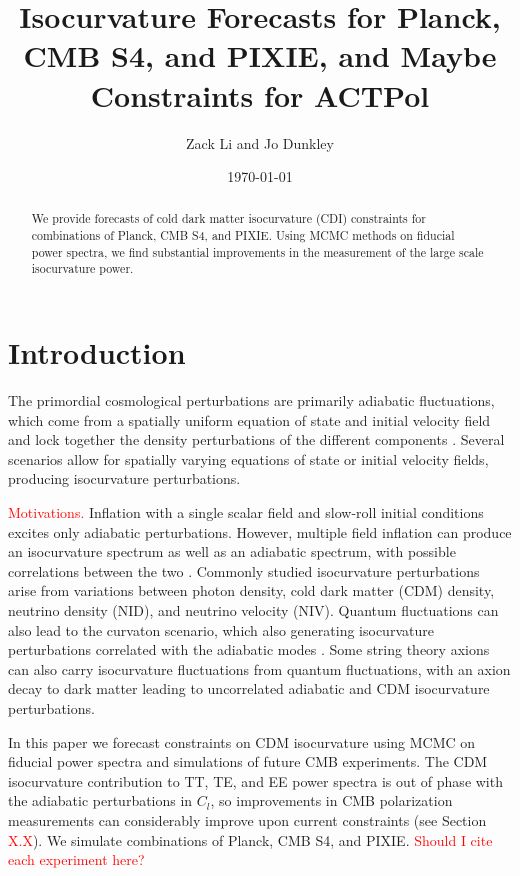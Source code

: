 \documentclass{emulateapj}
\newcommand\writingnote[1]{\textcolor{red}{#1}}
\begin{document}
\title{Isocurvature Forecasts for Planck, CMB S4, and PIXIE, and Maybe Constraints for ACTPol}
\author{Zack Li and Jo Dunkley}
\date{\today}
{}


\begin{abstract}
We provide forecasts of cold dark matter isocurvature (CDI) constraints for combinations of Planck, CMB S4, and PIXIE. Using MCMC methods on fiducial power spectra, we find substantial improvements in the measurement of the large scale isocurvature power. 
\end{abstract}

\section{Introduction}

The primordial cosmological perturbations are primarily adiabatic fluctuations, which come from a spatially uniform equation of state and initial velocity field and lock together the density perturbations of the different components \citep{planckXXII:2013}.  Several scenarios allow for spatially varying equations of state or initial velocity fields, producing isocurvature perturbations. 

\writingnote{Motivations.}
Inflation with a single scalar field and slow-roll initial conditions excites only adiabatic perturbations. However, multiple field inflation can produce an isocurvature spectrum as well as an adiabatic spectrum, with possible correlations between the two \citep{langlois:1999}. Commonly studied isocurvature perturbations arise from variations between photon density, cold dark matter (CDM) density, neutrino density (NID), and neutrino velocity (NIV). Quantum fluctuations can also lead to the curvaton scenario, which also generating isocurvature perturbations correlated with the adiabatic modes \citep{baumann/etal:2009}. Some string theory axions can also carry isocurvature fluctuations from quantum fluctuations, with an axion decay to dark matter leading to uncorrelated adiabatic and CDM isocurvature perturbations.

In this paper we forecast constraints on CDM isocurvature using MCMC on fiducial power spectra and simulations of future CMB experiments. The CDM isocurvature contribution to TT, TE, and EE power spectra is out of phase with the adiabatic perturbations in $C_l$, so improvements in CMB polarization measurements can considerably improve upon current constraints (see Section \writingnote{X.X}). We simulate combinations of Planck, CMB S4, and PIXIE. \writingnote{Should I cite each experiment here?}
\end{document}
